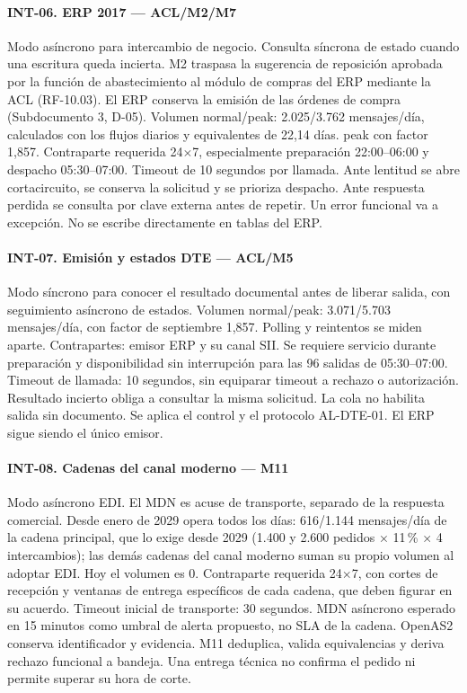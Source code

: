 \paragraph{INT-06. ERP 2017 — ACL/M2/M7}
Modo asíncrono para intercambio de negocio. Consulta síncrona de estado cuando una escritura queda incierta. M2 traspasa la sugerencia de reposición aprobada por la función de abastecimiento al módulo de compras del ERP mediante la ACL (RF-10.03). El ERP conserva la emisión de las órdenes de compra (Subdocumento 3, D-05). Volumen normal/peak: 2.025/3.762 mensajes/día, calculados con los flujos diarios y equivalentes de 22,14 días. peak con factor 1,857. Contraparte requerida 24$\times$7, especialmente preparación 22:00--06:00 y despacho 05:30--07:00. Timeout de 10 segundos por llamada. Ante lentitud se abre cortacircuito, se conserva la solicitud y se prioriza despacho. Ante respuesta perdida se consulta por clave externa antes de repetir. Un error funcional va a excepción. No se escribe directamente en tablas del ERP.

\paragraph{INT-07. Emisión y estados DTE — ACL/M5}
Modo síncrono para conocer el resultado documental antes de liberar salida, con seguimiento asíncrono de estados. Volumen normal/peak: 3.071/5.703 mensajes/día, con factor de septiembre 1,857. Polling y reintentos se miden aparte. Contrapartes: emisor ERP y su canal SII. Se requiere servicio durante preparación y disponibilidad sin interrupción para las 96 salidas de 05:30--07:00. Timeout de llamada: 10 segundos, sin equiparar timeout a rechazo o autorización. Resultado incierto obliga a consultar la misma solicitud. La cola no habilita salida sin documento. Se aplica el control y el protocolo AL-DTE-01. El ERP sigue siendo el único emisor.

\paragraph{INT-08. Cadenas del canal moderno — M11}
Modo asíncrono EDI. El MDN es acuse de transporte, separado de la respuesta comercial. Desde enero de 2029 opera todos los días: 616/1.144 mensajes/día de la cadena principal, que lo exige desde 2029 (1.400 y 2.600 pedidos × 11\,\% × 4 intercambios); las demás cadenas del canal moderno suman su propio volumen al adoptar EDI. Hoy el volumen es 0. Contraparte requerida 24$\times$7, con cortes de recepción y ventanas de entrega específicos de cada cadena, que deben figurar en su acuerdo. Timeout inicial de transporte: 30 segundos. MDN asíncrono esperado en 15 minutos como umbral de alerta propuesto, no SLA de la cadena. OpenAS2 conserva identificador y evidencia. M11 deduplica, valida equivalencias y deriva rechazo funcional a bandeja. Una entrega técnica no confirma el pedido ni permite superar su hora de corte.

